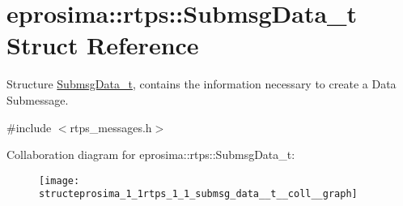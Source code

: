 \hypertarget{structeprosima_1_1rtps_1_1_submsg_data__t}{\section{eprosima\-:\-:rtps\-:\-:\-Submsg\-Data\-\_\-t \-Struct \-Reference}
\label{structeprosima_1_1rtps_1_1_submsg_data__t}
}


\-Structure \hyperlink{structeprosima_1_1rtps_1_1_submsg_data__t}{\-Submsg\-Data\-\_\-t}, contains the information necessary to create a \-Data \-Submessage.  




{\ttfamily \#include $<$rtps\-\_\-messages.\-h$>$}



\-Collaboration diagram for eprosima\-:\-:rtps\-:\-:\-Submsg\-Data\-\_\-t\-:\nopagebreak
\begin{figure}[H]
\begin{center}
\leavevmode
\texttt{[image: structeprosima\_1\_1rtps\_1\_1\_submsg\_data\_\_t\_\_coll\_\_graph]}
\end{center}
\end{figure}
